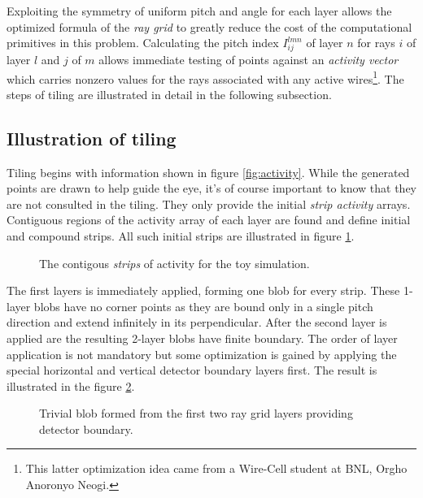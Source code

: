 \documentclass[11pt]{article}
\begin{document}
Exploiting the symmetry of uniform pitch and angle for each layer allows the optimized formula of the \emph{ray grid} to greatly reduce the cost of the computational primitives in this problem.  Calculating the pitch index \(I^{lmn}_{ij}\) of layer \(n\) for rays \(i\) of layer \(l\) and \(j\) of \(m\) allows immediate testing of points against an \emph{activity vector} which carries nonzero values for the rays associated with any active wires\footnote{This latter optimization idea came from a Wire-Cell student at BNL, Orgho Anoronyo Neogi.}.  The steps of tiling are illustrated in detail in the following subsection.



\subsection{Illustration of tiling}
\label{sec:tiling}

Tiling begins with information shown in figure \ref{fig:activity}.  While the generated points are drawn to help guide the eye, it's of course important to know that they are not consulted in the tiling.  They only provide the initial \emph{strip activity} arrays.  Contiguous regions of the activity array of each layer are found and define initial and compound strips.  All such initial strips are illustrated in figure \ref{fig:strips}.

\begin{figure}[htbp]
\centering

\caption{\label{fig:strips}
The contigous \emph{strips} of activity for the toy simulation.}
\end{figure}

The first layers is immediately applied, forming one blob for every strip.  These 1-layer blobs have no corner points as they are bound only in a single pitch direction and extend infinitely in its perpendicular.  After the second layer is applied are the resulting 2-layer blobs have finite boundary.  The order of layer application is not mandatory but some optimization is gained by applying the special horizontal and vertical detector boundary layers first.  The result is illustrated in the figure \ref{fig:blob2}.

\begin{figure}[htbp]
\centering

\caption{\label{fig:blob2}
Trivial blob formed from the first two ray grid layers providing detector boundary.}
\end{figure}
\end{document}
